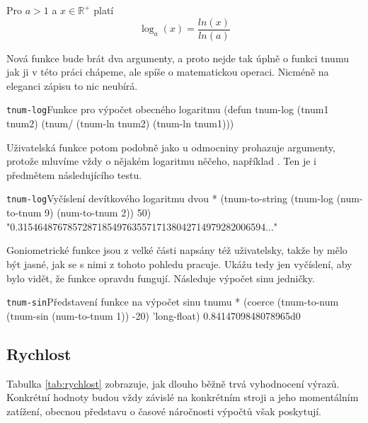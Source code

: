 \begin{fact}
Pro $a>1$ a $x\in\mathbb{R}^+$ platí
\begin{equation}
\log_a(x)=\frac{ln(x)}{ln(a)}
\end{equation}
\end{fact}

Nová funkce bude brát dva argumenty, a proto nejde tak úplně o funkci tnumu jak ji v této práci chápeme, ale spíše o matematickou operaci. Nicméně na eleganci zápisu to nic neubírá.

\begin{lispcode}{\texttt{tnum-log}}{Funkce pro výpočet obecného logaritmu}
(\textcolor{funkcionalni}{defun} \textcolor{pojmenovan}{tnum-log} (tnum1 tnum2)
  (\textcolor{moje}{tnum/} (\textcolor{moje}{tnum-ln} tnum2) (\textcolor{moje}{tnum-ln} tnum1)))
\end{lispcode}

Uživatelská funkce potom podobně jako u odmocniny prohazuje argumenty, protože mluvíme vždy o nějakém logaritmu něčeho, například . Ten je i předmětem následujícího testu.

\begin{lisptest}{\texttt{tnum-log}}{Vyčíslení devítkového logaritmu dvou}
* (tnum-to-string (tnum-log (num-to-tnum 9) (num-to-tnum 2)) 50)
"0.31546487678572871854976355717138042714979282006594..."
\end{lisptest}

Goniometrické funkce jsou z velké části napsány též uživatelsky, takže by mělo být jasné, jak se s nimi z tohoto pohledu pracuje. Ukážu tedy jen vyčíslení, aby bylo vidět, že funkce opravdu fungují. Následuje výpočet sinu jedničky.

\begin{lisptest}{\texttt{tnum-sin}}{Představení funkce na výpočet sinu tnumu}
* (coerce (tnum-to-num (tnum-sin (num-to-tnum 1)) -20)
    'long-float)
0.8414709848078965d0
\end{lisptest}

\subsection{Rychlost}
Tabulka \ref{tab:rychlost} zobrazuje, jak dlouho běžně trvá vyhodnocení výrazů. Konkrétní hodnoty budou vždy závislé na konkrétním stroji a jeho momentálním zatížení, obecnou představu o časové náročnosti výpočtů však poskytují.

